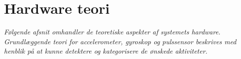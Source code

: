 \section{Hardware teori}
\textit{Følgende afsnit omhandler de teoretiske aspekter af systemets hardware. Grundlæggende teori for accelerometer, gyroskop og pulssensor beskrives med henblik på at kunne detektere og kategorisere de ønskede aktiviteter.}
